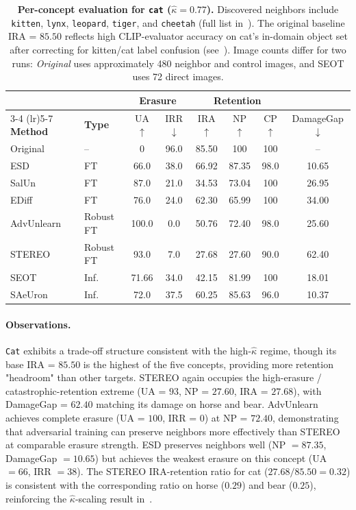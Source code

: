 \begin{table}[ht]
\centering
\small
\setlength{\tabcolsep}{5pt}
\begin{tabular}{llcccccc}
\toprule
& & \multicolumn{2}{c}{\textbf{Erasure}} & \multicolumn{3}{c}{\textbf{Retention}} & \\
\cmidrule(lr){3-4} \cmidrule(lr){5-7}
\textbf{Method} & \textbf{Type} & UA$\uparrow$ & IRR$\downarrow$ & IRA$\uparrow$ & NP$\uparrow$ & CP$\uparrow$ & DamageGap$\downarrow$ \\
\midrule
Original    & --          & 0     & 96.0  & 85.50 & 100   & 100   & --    \\
\midrule
ESD         & FT          & 66.0  & 38.0  & 66.92 & 87.35 & 98.0  & 10.65  \\
SalUn       & FT          & 87.0  & 21.0  & 34.53 & 73.04 & 100   & 26.95 \\
EDiff       & FT          & 76.0  & 24.0  & 62.30 & 65.99 & 100   & 34.00 \\
\midrule
AdvUnlearn  & Robust FT   & 100.0 & 0.0   & 50.76 & 72.40 & 98.0  & 25.60 \\
STEREO      & Robust FT   & 93.0  & 7.0   & 27.68 & 27.60 & 90.0  & 62.40 \\
\midrule
SEOT        & Inf.        & 71.66 & 34.0  & 42.15 & 81.99 & 100   & 18.01 \\
SAeUron     & Inf.        & 72.0  & 37.5  & 60.25 & 85.63 & 96.0  & 10.37 \\
\bottomrule
\end{tabular}
\caption{\textbf{Per-concept evaluation for \texttt{cat} ($\hat\kappa = 0.77$).} Discovered neighbors include \texttt{kitten}, \texttt{lynx}, \texttt{leopard}, \texttt{tiger}, and \texttt{cheetah} (full list in~). The original baseline IRA = $85.50$ reflects high CLIP-evaluator accuracy on cat's in-domain object set after correcting for kitten/cat label confusion (see~). Image counts differ for two runs: \emph{Original} uses approximately 480 neighbor and control images, and SEOT uses 72 direct images.}
\label{tab:per_concept_cat}
\end{table}

\paragraph{Observations.}
\texttt{Cat} exhibits a trade-off structure consistent with the high-$\hat\kappa$ regime, though its base IRA = $85.50$ is the highest of the five concepts, providing more retention "headroom" than other targets. STEREO again occupies the high-erasure / catastrophic-retention extreme (UA = $93$, NP = $27.60$, IRA = $27.68$), with DamageGap = $62.40$ matching its damage on horse and bear. AdvUnlearn achieves complete erasure (UA = $100$, IRR = $0$) at NP = $72.40$, demonstrating that adversarial training can preserve neighbors more effectively than STEREO at comparable erasure strength. ESD preserves neighbors well (NP $=87.35$, DamageGap $=10.65$) but achieves the weakest erasure on this concept (UA $=66$, IRR $=38$). The STEREO IRA-retention ratio for cat ($27.68 / 85.50 = 0.32$) is consistent with the corresponding ratio on horse ($0.29$) and bear ($0.25$), reinforcing the $\hat\kappa$-scaling result in~.
